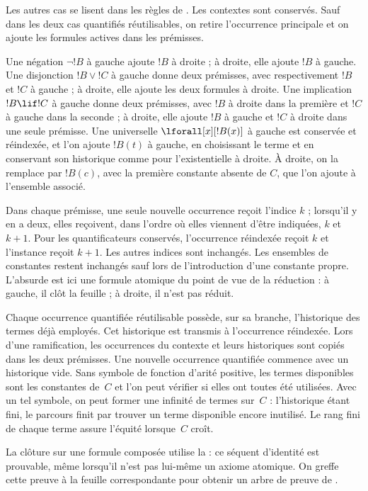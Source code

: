 \documentclass[../../../include/open-logic-section]{subfiles}
\begin{document}
Les autres cas se lisent dans les règles de .
Les contextes sont conservés. Sauf dans les deux cas
quantifiés réutilisables, on retire l'occurrence principale
et on ajoute les formules actives dans les prémisses.

Une négation $\lnot !B$ à gauche ajoute $!B$ à droite ;
à droite, elle ajoute $!B$ à gauche.
Une disjonction $!B \lor !C$ à gauche donne deux
prémisses, avec respectivement $!B$ et $!C$ à gauche ;
à droite, elle ajoute les deux formules à droite.
Une implication $!B \lif !C$ à gauche donne deux
prémisses, avec $!B$ à droite dans la première
et $!C$ à gauche dans la seconde ; à droite,
elle ajoute $!B$ à gauche et $!C$ à droite dans
une seule prémisse.
Une universelle $\lforall[x][!B(x)]$ à gauche est
conservée et réindexée, et l'on ajoute $!B(t)$
à gauche, en choisissant le terme et en conservant
son historique comme pour l'existentielle à droite.
À droite, on la remplace par $!B(c)$, avec la
première constante absente de $C$, que l'on ajoute
à l'ensemble associé.

Dans chaque prémisse, une seule nouvelle occurrence
reçoit l'indice $k$ ; lorsqu'il y en a deux, elles
reçoivent, dans l'ordre où elles viennent d'être
indiquées, $k$ et $k+1$. Pour les quantificateurs
conservés, l'occurrence réindexée reçoit $k$ et
l'instance reçoit $k+1$. Les autres indices sont
inchangés. Les ensembles de constantes restent
inchangés sauf lors de l'introduction d'une constante
propre. L'absurde est ici une formule atomique
du point de vue de la réduction : à gauche,
il clôt la feuille ; à droite, il n'est pas réduit.

Chaque occurrence quantifiée réutilisable possède,
sur sa branche, l'historique des termes déjà employés.
Cet historique est transmis à l'occurrence réindexée.
Lors d'une ramification, les occurrences du contexte
et leurs historiques sont copiés dans les deux
prémisses. Une nouvelle occurrence quantifiée
commence avec un historique vide. Sans symbole de fonction
d'arité positive, les termes disponibles sont les constantes
de~$C$ et l'on peut vérifier si elles ont toutes été utilisées.
Avec un tel symbole, on peut former une infinité de termes
sur~$C$ : l'historique étant fini, le parcours finit par
trouver un terme disponible encore inutilisé. Le rang fini
de chaque terme assure l'équité lorsque~$C$ croît.

La clôture sur une formule composée utilise la
 : ce séquent
d'identité est prouvable, même lorsqu'il n'est pas
lui-même un axiome atomique. On greffe cette preuve
à la feuille correspondante pour obtenir un arbre
%
de preuve de .
\end{document}
